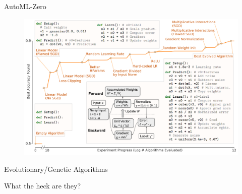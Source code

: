 \documentclass[aspectratio=169]{beamer}
\makeatletter
\newcommand{\white}[1]{{\color{pureminimalistic@text@white} #1}}
\makeatother
\begin{document}
\begin{frame}[plain]{AutoML-Zero \white{\cite{real2020automl}}}
    \begin{figure}
        \centering
        \includegraphics[scale=0.37]{figures/automl_zero_main_fig.png}
    \end{figure}
\end{frame}

\begin{frame}{Evolutionary/Genetic Algorithms}
    \begin{vfilleditems}
        \item \Huge What the heck are they? 
    \end{vfilleditems}
\end{frame}
\end{document}

